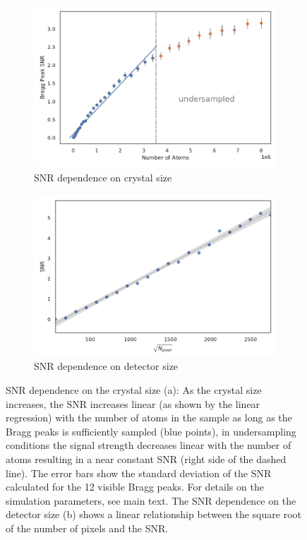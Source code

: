 \begin{figure}
	\centering
	\begin{subfigure}[b]{0.45\textwidth}
		\includegraphics[width=\linewidth]{images/SNRNatoms.pdf}
		\caption{ SNR dependence on crystal size}
		\label{fig:SNRNatoms}
	\end{subfigure}
	\hspace{0.02\textwidth}
	\begin{subfigure}[b]{0.45\textwidth}
		\includegraphics[width=\linewidth]{images/detsize.pdf}
		\caption{SNR dependence on detector size}
		\label{fig:SNRdetsize}
	\end{subfigure}
\caption[SNR dependence on crystal size and detector size]{SNR dependence on the crystal size (a): As the crystal size increases, the SNR increases linear (as shown by the linear regression) with the number of atoms in the sample as long as the Bragg peaks is sufficiently sampled (blue points), in undersampling conditions the signal strength decreases linear with the number of atoms resulting in a near constant SNR (right side of the dashed line). The error bars show the standard deviation of the SNR calculated for the 12 visible Bragg peaks. For details on the simulation parameters, see main text. The SNR dependence on the detector size (b) shows a linear relationship between the square root of the number of pixels and the SNR.}

\end{figure}


